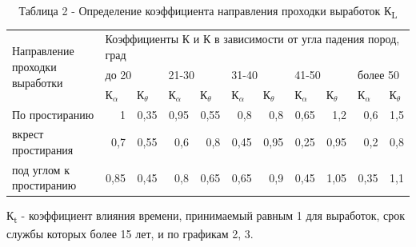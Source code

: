 \begin{table}[H]
\caption*{Таблица 2 - Определение коэффициента направления проходки выработок К\textsubscript{L}}
\centering
\begin{tabular}{|p{}|lrrrrrrrrr|}
\hline
\multirow{3}{=}{Направление проходки выработки} & \multicolumn{10}{l|}{Коэффициенты К и К в зависимости от угла падения пород, град} \\ \cline{2-11}
 & \multicolumn{2}{l|}{до 20} & \multicolumn{2}{l|}{21-30} & \multicolumn{2}{l|}{31-40} & \multicolumn{2}{l|}{41-50} & \multicolumn{2}{l|}{более 50} \\ \cline{2-11}
 & \multicolumn{1}{l|}{К$_{\alpha}$} & \multicolumn{1}{l|}{К$_{\theta}$} & \multicolumn{1}{l|}{К$_{\alpha}$} & \multicolumn{1}{l|}{К$_{\theta}$} & \multicolumn{1}{l|}{К$_{\alpha}$} & \multicolumn{1}{l|}{К$_{\theta}$} & \multicolumn{1}{l|}{К$_{\alpha}$} & \multicolumn{1}{l|}{К$_{\theta}$} & \multicolumn{1}{l|}{К$_{\alpha}$} & \multicolumn{1}{l|}{К$_{\theta}$} \\ \hline
По простиранию & \multicolumn{1}{r|}{1} & \multicolumn{1}{r|}{0,35} & \multicolumn{1}{r|}{0,95} & \multicolumn{1}{r|}{0,55} & \multicolumn{1}{r|}{0,8} & \multicolumn{1}{r|}{0,8} & \multicolumn{1}{r|}{0,65} & \multicolumn{1}{r|}{1,2} & \multicolumn{1}{r|}{0,6} & 1,5 \\ \hline
вкрест простирания & \multicolumn{1}{r|}{0,7} & \multicolumn{1}{r|}{0,55} & \multicolumn{1}{r|}{0,6} & \multicolumn{1}{r|}{0,8} & \multicolumn{1}{r|}{0,45} & \multicolumn{1}{r|}{0,95} & \multicolumn{1}{r|}{0,25} & \multicolumn{1}{r|}{0,95} & \multicolumn{1}{r|}{0,2} & 0,8 \\ \hline
под углом к простиранию & \multicolumn{1}{r|}{0,85} & \multicolumn{1}{r|}{0,45} & \multicolumn{1}{r|}{0,8} & \multicolumn{1}{r|}{0,65} & \multicolumn{1}{r|}{0,65} & \multicolumn{1}{r|}{0,9} & \multicolumn{1}{r|}{0,45} & \multicolumn{1}{r|}{1,05} & \multicolumn{1}{r|}{0,35} & 1,1 \\ \hline
\end{tabular}
\end{table}

К\textsubscript{t} - коэффициент влияния времени, принимаемый равным 1
для выработок, срок службы которых более 15 лет, и по графикам 2, 3.

